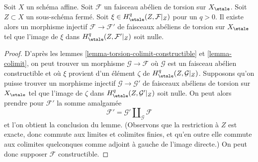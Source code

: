 \begin{lemma}
\label{lemma-efface-cohomology-on-closed-by-finite-cover}
Soit $X$ un schéma affine. Soit $\mathcal{F}$ un faisceau abélien de torsion
sur $X_\etale$. Soit $Z \subset X$ un sous-schéma fermé. Soit
$\xi \in H^q_\etale(Z, \mathcal{F}|_Z)$ pour un $q > 0$.
Il existe alors un morphisme injectif $\mathcal{F} \to \mathcal{F}'$
de faisceaux abéliens de torsion sur $X_\etale$ tel que
l'image de $\xi$ dans $H^q_\etale(Z, \mathcal{F}'|_Z)$ soit nulle.
\end{lemma}

\begin{proof}
D'après les lemmes \ref{lemma-torsion-colimit-constructible} et \ref{lemma-colimit},
on peut trouver un morphisme $\mathcal{G} \to \mathcal{F}$ où $\mathcal{G}$
est un faisceau abélien constructible et où $\xi$ provient d'un élément $\zeta$ de
$H^q_\etale(Z, \mathcal{G}|_Z)$. Supposons qu'on puisse trouver un morphisme injectif
$\mathcal{G} \to \mathcal{G}'$ de faisceaux abéliens de torsion sur $X_\etale$
tel que l'image de $\zeta$ dans $H^q_\etale(Z, \mathcal{G}'|_Z)$ soit nulle.
On peut alors prendre pour $\mathcal{F}'$ la somme amalgamée
$$
\mathcal{F}' = \mathcal{G}' \amalg_{\mathcal{G}} \mathcal{F}
$$
et l'on obtient la conclusion du lemme. (Observons que la restriction
à $Z$ est exacte, donc commute aux limites et colimites finies, et qu'en outre
elle commute aux colimites quelconques comme adjoint à gauche de l'image directe.)
On peut donc supposer $\mathcal{F}$ constructible.


\end{proof}
